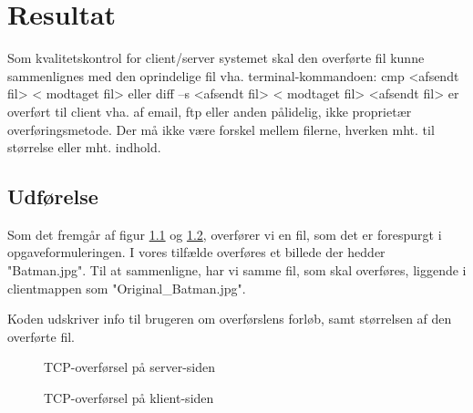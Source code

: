 \chapter{Resultat}

Som kvalitetskontrol for client/server systemet skal den overførte fil kunne
sammenlignes med den oprindelige fil vha. terminal-kommandoen:
cmp <afsendt fil> < modtaget fil>
eller
diff –s <afsendt fil> < modtaget fil>
<afsendt fil> er overført til client vha. af email, ftp eller anden pålidelig, ikke
proprietær overføringsmetode.
Der må ikke være forskel mellem filerne, hverken mht. til størrelse eller mht. indhold.

\section{Udførelse}

Som det fremgår af figur \ref{fig:file_serverTCP} og \ref{fig:file_clientTCP}, overfører vi en fil, som det er forespurgt i opgaveformuleringen. 
I vores tilfælde overføres et billede der hedder "Batman.jpg". Til at sammenligne, har vi samme fil, som skal overføres, liggende i clientmappen som "Original\_Batman.jpg". 

Koden udskriver info til brugeren om overførslens forløb, samt størrelsen af den overførte fil. 

\begin{figure}[h!]
	\centering
	\caption{TCP-overførsel på server-siden}
	\label{fig:file_serverTCP}
\end{figure}


\begin{figure}[h!]
	\centering
	\caption{TCP-overførsel på klient-siden}
	\label{fig:file_clientTCP}
\end{figure}

